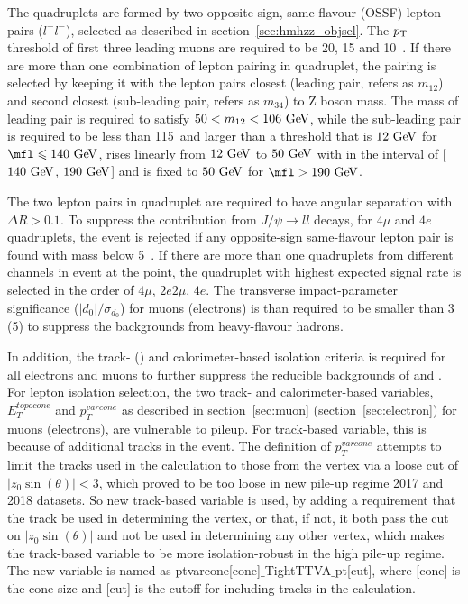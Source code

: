 The \llll quadruplets are formed by two opposite-sign, same-flavour (OSSF) lepton pairs ($l^{+}l^{-}$), selected as described in section~\ref{sec:hmhzz_objsel}.
The $p_{\text{T}}$ threshold of first three leading muons are required to be 20, 15 and 10~\gev.
If there are more than one combination of lepton pairing in quadruplet, the pairing is selected by keeping it with the lepton pairs closest (leading pair, refers as $m_{12}$) and second closest (sub-leading pair, refers as $m_{34}$) to Z boson mass.
The mass of leading pair is required to satisfy $50 < m_{12} < 106~\text{Ge\kern -0.1em V}$, while the sub-leading pair is required to be less than 115~\gev and larger than a threshold that is $12~\text{Ge\kern -0.1em V}$ for $\mfl \leq 140~\gev$, rises linearly from $12~\text{Ge\kern -0.1em V}$ to $50~\text{Ge\kern -0.1em V}$ with \mfl in the interval of [$140~\text{Ge\kern -0.1em V}$, $190~\text{Ge\kern -0.1em V}$] and is fixed to $50~\text{Ge\kern -0.1em V}$ for $\mfl > 190~\gev$. 

The two lepton pairs in quadruplet are required to have angular separation with $\Delta R > 0.1$.
To suppress the contribution from $J/\psi \rightarrow ll$ decays, for $4\mu$ and $4e$ quadruplets, the event is rejected if any opposite-sign same-flavour lepton pair is found with mass below 5~\gev.
If there are more than one quadruplets from different channels in event at the point, the quadruplet with highest expected signal rate is selected in the order of $4\mu$, $2e2\mu$, $4e$.
The transverse impact-parameter significance ($|d_0|/\sigma_{d_0}$) for muons (electrons) is than required to be smaller than 3 (5) to suppress the backgrounds from heavy-flavour hadrons.

In addition, the track- (\pt) and calorimeter-based isolation criteria is required for all electrons and muons to further suppress the reducible backgrounds of \Zjet and \ttbar.
For lepton isolation selection, the two track- and calorimeter-based variables, $E_{T}^{topocone}$ and $p_{T}^{varcone}$ as described in section~\ref{sec:muon} (section~\ref{sec:electron}) for muons (electrons), are vulnerable to pileup.
For track-based variable, this is because of additional tracks in the event.
The definition of $p_{T}^{varcone}$ attempts to limit the tracks used in the calculation to those from the vertex via a loose cut of $|z_0\sin(\theta)| < 3$,
which proved to be too loose in new pile-up regime 2017 and 2018 datasets.
So new track-based variable is used, 
by adding a requirement that the track be used in determining the vertex, or that, if not, it both pass the cut on $|z_0\sin(\theta)|$ and not be used in determining any other vertex,
which makes the track-based variable to be more isolation-robust in the high pile-up regime.
The new variable is named as ptvarcone[cone]$\_$TightTTVA$\_$pt[\pt cut], where [cone] is the cone size and [\pt cut] is the cutoff for including tracks in the calculation.


